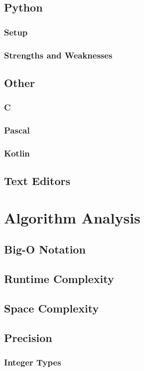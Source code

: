 \documentclass[12pt]{article}
\begin{document}
\subsection{Python}
\subsubsection{Setup}
\subsubsection{Strengths and Weaknesses}
\subsection{Other}
\subsubsection{C}
\subsubsection{Pascal}
\subsubsection{Kotlin}
\subsection{Text Editors}

\hspace{0mm}

\section{Algorithm Analysis}
\subsection{Big-O Notation}
\subsection{Runtime Complexity}
\subsection{Space Complexity}
\subsection{Precision}
\subsubsection{Integer Types}
\end{document}
